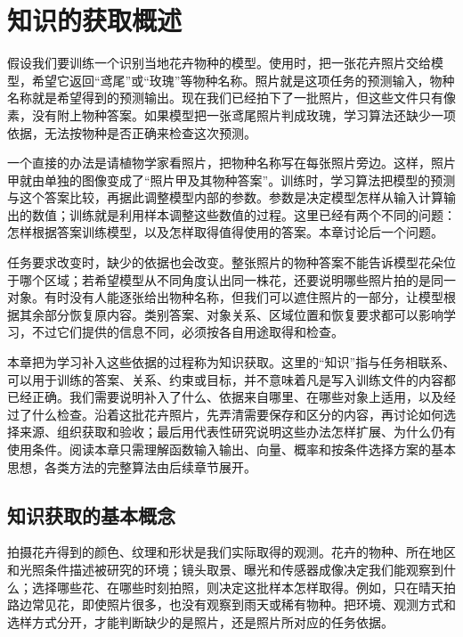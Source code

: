 \chapter{知识的获取概述}
\label{chap:knowledge-acquisition-overview}

假设我们要训练一个识别当地花卉物种的模型。使用时，把一张花卉照片交给模型，希望它返回“鸢尾”或“玫瑰”等物种名称。照片就是这项任务的预测输入，物种名称就是希望得到的预测输出。现在我们已经拍下了一批照片，但这些文件只有像素，没有附上物种答案。如果模型把一张鸢尾照片判成玫瑰，学习算法还缺少一项依据，无法按物种是否正确来检查这次预测。

一个直接的办法是请植物学家看照片，把物种名称写在每张照片旁边。这样，照片甲就由单独的图像变成了“照片甲及其物种答案”。训练时，学习算法把模型的预测与这个答案比较，再据此调整模型内部的参数。参数是决定模型怎样从输入计算输出的数值；训练就是利用样本调整这些数值的过程。这里已经有两个不同的问题：怎样根据答案训练模型，以及怎样取得值得使用的答案。本章讨论后一个问题。

任务要求改变时，缺少的依据也会改变。整张照片的物种答案不能告诉模型花朵位于哪个区域；若希望模型从不同角度认出同一株花，还要说明哪些照片拍的是同一对象。有时没有人能逐张给出物种名称，但我们可以遮住照片的一部分，让模型根据其余部分恢复原内容。类别答案、对象关系、区域位置和恢复要求都可以影响学习，不过它们提供的信息不同，必须按各自用途取得和检查。

本章把为学习补入这些依据的过程称为知识获取。这里的“知识”指与任务相联系、可以用于训练的答案、关系、约束或目标，并不意味着凡是写入训练文件的内容都已经正确。我们需要说明补入了什么、依据来自哪里、在哪些对象上适用，以及经过了什么检查。沿着这批花卉照片，先弄清需要保存和区分的内容，再讨论如何选择来源、组织获取和验收；最后用代表性研究说明这些办法怎样扩展、为什么仍有使用条件。阅读本章只需理解函数输入输出、向量、概率和按条件选择方案的基本思想，各类方法的完整算法由后续章节展开。

\section{知识获取的基本概念}
\label{sec:knowledge-acquisition-problem}

拍摄花卉得到的颜色、纹理和形状是我们实际取得的观测。花卉的物种、所在地区和光照条件描述被研究的环境；镜头取景、曝光和传感器成像决定我们能观察到什么；选择哪些花、在哪些时刻拍照，则决定这批样本怎样取得。例如，只在晴天拍路边常见花，即使照片很多，也没有观察到雨天或稀有物种。把环境、观测方式和选样方式分开，才能判断缺少的是照片，还是照片所对应的任务依据。

